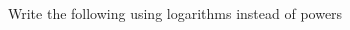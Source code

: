
\newcommand{\MathsTwoLogsQOneWkg}[3]{
	\par
	$%
	#1^{#2} = #3
	\rightarrow$
	\colorbox{yellow}{%
		$\log_{#1}{#3}=#2$%
	}
}
\newcommand{\MathsTwoLogsQOneQs}[3]{
	$#1^{#2} = #3$
}
\newcommand{\MathsTwoLogsQOneSols}[3]{
	$\log_{#1}{#3}=#2$%
}

\question Write the following using logarithms instead of powers
\begin{multicols}{2}
\end{multicols}
